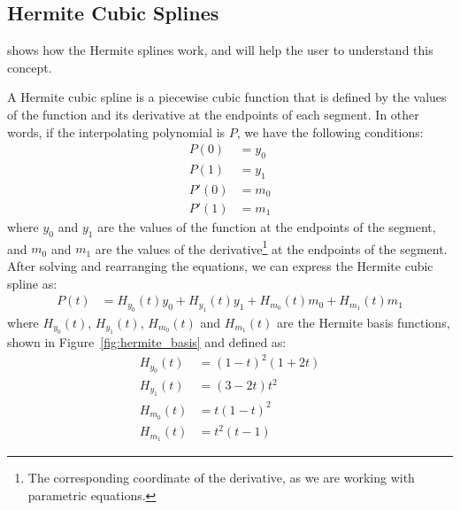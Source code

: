 \subsection{Hermite Cubic Splines}

\begin{observacion}
     shows how the Hermite splines work, and will help the user to understand this concept.
\end{observacion}

A Hermite cubic spline is a piecewise cubic function that is defined by the values of the function and its derivative at the endpoints of each segment. In other words, if the interpolating polynomial is $P$, we have the following conditions:
\begin{align*}
    P(0) &= y_0 \\
    P(1) &= y_1 \\
    P'(0) &= m_0 \\
    P'(1) &= m_1
\end{align*}
where $y_0$ and $y_1$ are the values of the function at the endpoints of the segment, and $m_0$ and $m_1$ are the values of the derivative\footnote{The corresponding coordinate of the derivative, as we are working with parametric equations.} at the endpoints of the segment. After solving and rearranging the equations, we can express the Hermite cubic spline as:
\begin{align*}
    P(t) &= H_{y_0}(t) y_0 + H_{y_1}(t) y_1 + H_{m_0}(t) m_0 + H_{m_1}(t) m_1
\end{align*}
where $H_{y_0}(t)$, $H_{y_1}(t)$, $H_{m_0}(t)$ and $H_{m_1}(t)$ are the Hermite basis functions, shown in Figure~\ref{fig:hermite_basis} and defined as:
\begin{align*}
    H_{y_0}(t) &=  (1 - t)^2(1 + 2t) \\
    H_{y_1}(t) &= (3 - 2t)t^2 \\
    H_{m_0}(t) &= t(1 - t)^2 \\
    H_{m_1}(t) &= t^2 (t - 1)
\end{align*}
